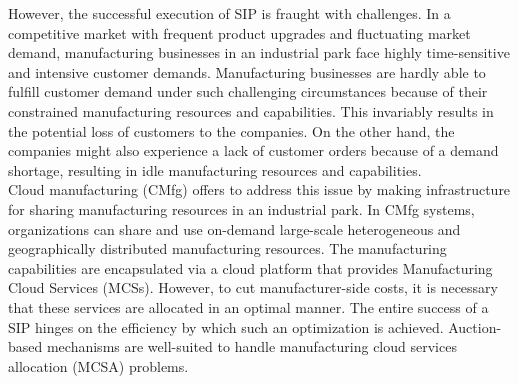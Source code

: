 \documentclass[paper=a4wide, fontsize=12pt]{scrartcl}	 %
\begin{document}
However, the successful execution of SIP is fraught with challenges. In a competitive market with frequent product upgrades and fluctuating market demand, manufacturing businesses in an industrial park face highly time-sensitive and intensive customer demands. Manufacturing businesses are hardly able to fulfill customer demand under such challenging circumstances because of their constrained manufacturing resources and capabilities. This invariably results in the potential loss of customers to the companies. On the other hand, the companies might also experience a lack of customer orders because of a demand shortage, resulting in idle manufacturing resources and capabilities. \\

Cloud manufacturing (CMfg) offers to address this issue by making infrastructure for sharing manufacturing resources in an industrial park. In CMfg systems, organizations can share and use on-demand large-scale heterogeneous and geographically distributed manufacturing resources. The manufacturing capabilities are encapsulated via a cloud platform that provides Manufacturing Cloud Services (MCSs). However, to cut manufacturer-side costs, it is necessary that these services are allocated in an optimal manner. The entire success of a SIP hinges on the efficiency by which such an optimization is achieved. Auction-based mechanisms \cite{Kang2022} are well-suited to handle manufacturing cloud services allocation (MCSA) problems. \\
\end{document}
